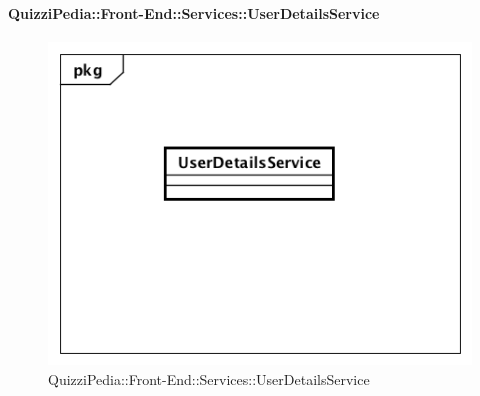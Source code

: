 \paragraph{QuizziPedia::Front-End::Services::UserDetailsService}
\begin{figure}
	\centering
	\includegraphics[scale=0.45]{UML/Classi/Front-End/QuizziPedia_Front-end_Services_UserDetailsService.png}
	\caption{QuizziPedia::Front-End::Services::UserDetailsService}
\end{figure}
